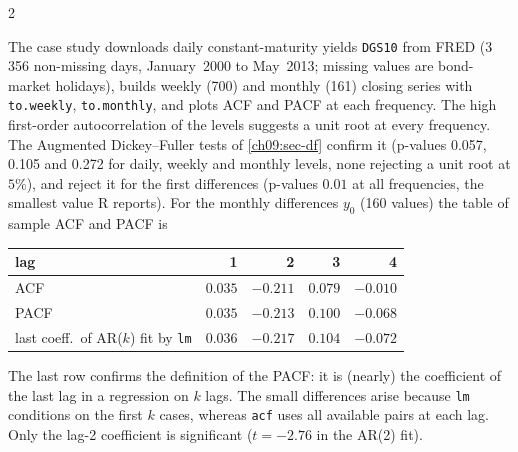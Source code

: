 \begin{paracol}{2}
\begin{casestudy}\label{ch09:cs-3a}
The case study downloads daily constant-maturity yields \texttt{DGS10} from FRED (3\,356 non-missing days, January~2000 to
May~2013; missing values are bond-market holidays), builds weekly (700) and monthly (161) closing series with
\texttt{to.weekly}, \texttt{to.monthly}, and plots ACF and PACF at each frequency. The high first-order
autocorrelation of the levels suggests a unit root at every frequency. The Augmented Dickey--Fuller tests of
\cref{ch09:sec-df} confirm it (p-values 0.057, 0.105 and 0.272 for daily, weekly and monthly levels, none rejecting a unit root
at $5\%$), and reject it for the first differences (p-values $0.01$ at all frequencies, the smallest value R reports).
For the monthly differences $y_0$ (160 values) the table of sample ACF and PACF is
\begin{center}\small
\begin{tabular}{@{}l rrrr@{}}
\toprule
lag & 1 & 2 & 3 & 4\\
\midrule
ACF & $0.035$ & $-0.211$ & $0.079$ & $-0.010$\\
PACF & $0.035$ & $-0.213$ & $0.100$ & $-0.068$\\
\midrule
last coeff.\ of AR($k$) fit by \texttt{lm} & $0.036$ & $-0.217$ & $0.104$ & $-0.072$\\
\bottomrule
\end{tabular}
\end{center}
The last row confirms the definition of the PACF: it is (nearly) the coefficient of the last lag in a regression on $k$ lags.
The small differences arise because \texttt{lm} conditions on the first $k$ cases, whereas \texttt{acf} uses all available
pairs at each lag. Only the lag-2 coefficient is significant ($t=-2.76$ in the AR(2) fit).
\end{casestudy}


\end{paracol}
